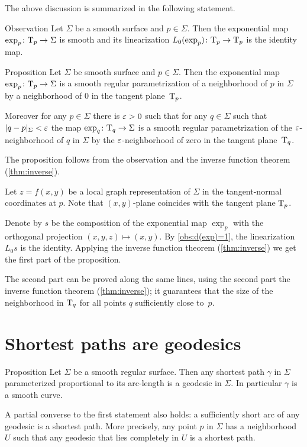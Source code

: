 The above discussion is summarized in the following statement. 

\begin{thm}{Observation}\label{obs:d(exp)=1}
Let $\Sigma$ be a smooth surface and $p\in \Sigma$.
Then the exponential map $\exp_p\colon\mathrm{T}_p\to \Sigma$ is smooth and its linearization $L_0(\exp_p)\colon\mathrm{T}_p\to \mathrm{T}_p$ is the identity map. %
\end{thm}


\begin{thm}{Proposition}\label{prop:exp}
Let $\Sigma$ be smooth surface and $p\in \Sigma$.
Then the exponential map $\exp_p\colon\mathrm{T}_p\to \Sigma$ is a smooth regular parametrization of a neighborhood of $p$ in $\Sigma$ by a neighborhood of $0$ in the tangent plane~$\mathrm{T}_p$.

Moreover for any $p\in \Sigma$ there is $\varepsilon>0$ such that for any $q\in \Sigma$ such that $|q-p|_\Sigma<\varepsilon$ the map 
$\exp_q\colon\mathrm{T}_q\to \Sigma$ is a smooth regular parametrization of the $\varepsilon$-neighborhood of $q$ in $\Sigma$ by the $\varepsilon$-neighborhood of zero in the tangent plane~$\mathrm{T}_q$. %
\end{thm}

The proposition follows from the observation and the inverse function theorem (\ref{thm:inverse}). %

Let $z=f(x,y)$ be a local graph representation of $\Sigma$ in the tangent-normal coordinates at $p$.
Note that $(x,y)$-plane coincides with the tangent plane $\mathrm{T}_p$.

Denote by $s$ be the composition of  the exponential map $\exp_p$ with the orthogonal projection $(x,y,z)\mapsto (x,y)$.
By \ref{obs:d(exp)=1}, the linearization $L_0s$ is the identity.
Applying the inverse function theorem (\ref{thm:inverse}) we get the first part of the proposition.

The second part can be proved along the same lines, using the second part the inverse function theorem (\ref{thm:inverse});
it guarantees that the size of the neighborhood in $\mathrm{T}_q$ for all points $q$ sufficiently close to~$p$.
\qeds

\section{Shortest paths are geodesics}

\begin{thm}{Proposition}\label{prop:gamma''}
Let $\Sigma$ be a smooth regular surface.
Then any shortest path $\gamma$ in $\Sigma$ parameterized proportional to its arc-length is a geodesic in $\Sigma$.
In particular $\gamma$ is a smooth curve.

A partial converse to the first statement also holds: a sufficiently short arc of any geodesic is a shortest path.
More precisely, any point $p$ in $\Sigma$ has a neighborhood $U$ such that any geodesic that lies completely in $U$ is a shortest path.
\end{thm}

